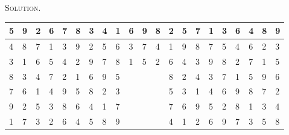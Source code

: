 \documentclass[12pt, a4paper, oneside]{article}
\newenvironment{solution}{\par\noindent\textsc{Solution. }}{\\\par}
\begin{document}
\begin{solution}
\begin{table}[]
\begin{tabular}{llllll|l|l|l|lll|l|l|l|llllll}
				\multicolumn{1}{|l|}{5} & \multicolumn{1}{l|}{9} & \multicolumn{1}{l|}{2} & \multicolumn{1}{l|}{6} & \multicolumn{1}{l|}{7} & 8 & 3 & 4 & 1 & \multicolumn{1}{l|}{6} & \multicolumn{1}{l|}{9} & 8 & 2 & 5 & 7 & \multicolumn{1}{l|}{1} & \multicolumn{1}{l|}{3} & \multicolumn{1}{l|}{6} & \multicolumn{1}{l|}{4} & \multicolumn{1}{l|}{8} & \multicolumn{1}{l|}{9} \\ \hline
				\multicolumn{1}{|l|}{4} & \multicolumn{1}{l|}{8} & \multicolumn{1}{l|}{7} & \multicolumn{1}{l|}{1} & \multicolumn{1}{l|}{3} & 9 & 2 & 5 & 6 & \multicolumn{1}{l|}{3} & \multicolumn{1}{l|}{7} & 4 & 1 & 9 & 8 & \multicolumn{1}{l|}{7} & \multicolumn{1}{l|}{5} & \multicolumn{1}{l|}{4} & \multicolumn{1}{l|}{6} & \multicolumn{1}{l|}{2} & \multicolumn{1}{l|}{3} \\ \hline
				\multicolumn{1}{|l|}{3} & \multicolumn{1}{l|}{1} & \multicolumn{1}{l|}{6} & \multicolumn{1}{l|}{5} & \multicolumn{1}{l|}{4} & 2 & 9 & 7 & 8 & \multicolumn{1}{l|}{1} & \multicolumn{1}{l|}{5} & 2 & 6 & 4 & 3 & \multicolumn{1}{l|}{9} & \multicolumn{1}{l|}{8} & \multicolumn{1}{l|}{2} & \multicolumn{1}{l|}{7} & \multicolumn{1}{l|}{1} & \multicolumn{1}{l|}{5} \\ \hline
				\multicolumn{1}{|l|}{8} & \multicolumn{1}{l|}{3} & \multicolumn{1}{l|}{4} & \multicolumn{1}{l|}{7} & \multicolumn{1}{l|}{2} & 1 & 6 & 9 & 5 &                        &                        &   & 8 & 2 & 4 & \multicolumn{1}{l|}{3} & \multicolumn{1}{l|}{7} & \multicolumn{1}{l|}{1} & \multicolumn{1}{l|}{5} & \multicolumn{1}{l|}{9} & \multicolumn{1}{l|}{6} \\ \cline{1-9} \cline{13-21} 
				\multicolumn{1}{|l|}{7} & \multicolumn{1}{l|}{6} & \multicolumn{1}{l|}{1} & \multicolumn{1}{l|}{4} & \multicolumn{1}{l|}{9} & 5 & 8 & 2 & 3 &                        &                        &   & 5 & 3 & 1 & \multicolumn{1}{l|}{4} & \multicolumn{1}{l|}{6} & \multicolumn{1}{l|}{9} & \multicolumn{1}{l|}{8} & \multicolumn{1}{l|}{7} & \multicolumn{1}{l|}{2} \\ \cline{1-9} \cline{13-21} 
				\multicolumn{1}{|l|}{9} & \multicolumn{1}{l|}{2} & \multicolumn{1}{l|}{5} & \multicolumn{1}{l|}{3} & \multicolumn{1}{l|}{8} & 6 & 4 & 1 & 7 &                        &                        &   & 7 & 6 & 9 & \multicolumn{1}{l|}{5} & \multicolumn{1}{l|}{2} & \multicolumn{1}{l|}{8} & \multicolumn{1}{l|}{1} & \multicolumn{1}{l|}{3} & \multicolumn{1}{l|}{4} \\ \cline{1-9} \cline{13-21} 
				\multicolumn{1}{|l|}{1} & \multicolumn{1}{l|}{7} & \multicolumn{1}{l|}{3} & \multicolumn{1}{l|}{2} & \multicolumn{1}{l|}{6} & 4 & 5 & 8 & 9 &                        &                        &   & 4 & 1 & 2 & \multicolumn{1}{l|}{6} & \multicolumn{1}{l|}{9} & \multicolumn{1}{l|}{7} & \multicolumn{1}{l|}{3} & \multicolumn{1}{l|}{5} & \multicolumn{1}{l|}{8} \\ \cline{1-9} \cline{13-21} 

\end{tabular}
\end{table}
\end{solution}
\end{document}
